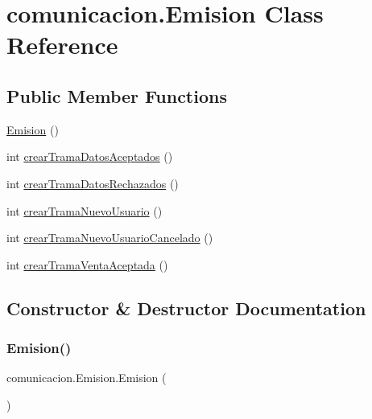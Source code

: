 \hypertarget{classcomunicacion_1_1_emision}{}\section{comunicacion.\+Emision Class Reference}
\label{classcomunicacion_1_1_emision}
\subsection*{Public Member Functions}
\begin{DoxyCompactItemize}
\item 
\mbox{\hyperlink{classcomunicacion_1_1_emision_a50f8bf5642629bd3a7903af0eac37391}{Emision}} ()
\item 
int \mbox{\hyperlink{classcomunicacion_1_1_emision_ac62ccb2290755183f662f8fa06ecdd52}{crear\+Trama\+Datos\+Aceptados}} ()
\item 
int \mbox{\hyperlink{classcomunicacion_1_1_emision_aafa487246461f3d94bb9939a0f345b50}{crear\+Trama\+Datos\+Rechazados}} ()
\item 
int \mbox{\hyperlink{classcomunicacion_1_1_emision_a3aa146bfc37a8c4e409097c4cf02fad0}{crear\+Trama\+Nuevo\+Usuario}} ()
\item 
int \mbox{\hyperlink{classcomunicacion_1_1_emision_aa2b41a69ac8589e519c45e5f674ab135}{crear\+Trama\+Nuevo\+Usuario\+Cancelado}} ()
\item 
int \mbox{\hyperlink{classcomunicacion_1_1_emision_ab2a5697489ffb7d87fc89057cc5f9798}{crear\+Trama\+Venta\+Aceptada}} ()
\end{DoxyCompactItemize}


\subsection{Constructor \& Destructor Documentation}
\mbox{\label{classcomunicacion_1_1_emision_a50f8bf5642629bd3a7903af0eac37391}} 
\subsubsection{\texorpdfstring{Emision()}{Emision()}}
{\footnotesize\ttfamily comunicacion.\+Emision.\+Emision (\begin{DoxyParamCaption}{ }\end{DoxyParamCaption})\hspace{0.3cm}{\ttfamily [inline]}}

